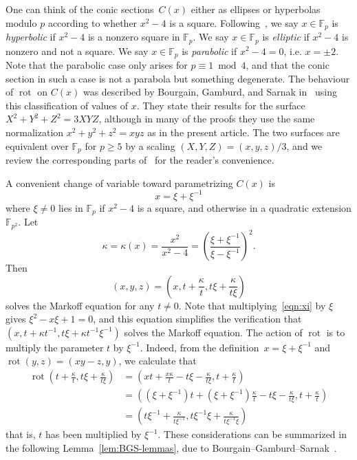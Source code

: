 \documentclass[10pt]{amsart}
\theoremstyle{definition}\newtheorem{defi}[theo]{Definition}\newtheorem{rema}[theo]{Remark}\newtheorem{exam}[theo]{Example}\newtheorem{exem}[theo]{Example}\newtheorem{nota}[theo]{Notation}
\newcommand{\F}{\mathbb{F}}
\DeclareMathOperator{\rot}{rot}
\begin{document}
One can think of the conic sections~$C(x)$ either as ellipses or hyperbolas modulo $p$ according to whether $x^2-4$ is a square. Following~\cite{BGS}, we say $x\in\F_{p}$ is \emph{hyperbolic} if $x^{2}-4$ is a nonzero square in $\F_{p}$. We say $x\in\F_{p}$ is \emph{elliptic} if $x^{2}-4$ is nonzero and not a square. We say $x\in\F_{p}$ is \emph{parabolic} if $x^{2}-4=0$, i.e. $x=\pm2$. Note that the parabolic case only arises for $p \equiv 1 \bmod 4$, and that the conic section in such a case is not a parabola but something degenerate. The behaviour of $\rot$ on $C(x)$ was described by Bourgain, Gamburd, and Sarnak in~\cite{BGS} using this classification of values of $x$. They state their results for the surface $X^2 + Y^2 + Z^2 = 3XYZ$, although in many of the proofs they use the same normalization $x^2 + y^2 + z^2 = xyz$ as in the present article. The two surfaces are equivalent over $\F_p$ for $p \geq 5$ by a scaling $(X,Y,Z) = (x,y,z)/3$, and we review the corresponding parts of~\cite{BGS} for the reader's convenience.

A convenient change of variable toward parametrizing $C(x)$ is
\begin{equation}\label{eqn:xi}
x = \xi + \xi^{-1}
\end{equation}
where $\xi \neq 0$ lies in $\F_p$ if $x^2-4$ is a square, and otherwise in a quadratic extension $\F_{p^2}$. Let
\begin{equation}\label{eqn:kappa}
\kappa = \kappa(x) = \frac{x^2}{x^2 - 4} = \left(\frac{ \xi + \xi^{-1} }{\xi - \xi^{-1}} \right)^2.
\end{equation}
Then
\[
(x,y,z) = \left(x, t + \frac{\kappa}{t}, t\xi + \frac{\kappa}{t\xi} \right)
\]
solves the Markoff equation for any $t \neq 0$. Note that multiplying~\eqref{eqn:xi} by $\xi$ gives $\xi^2 - x\xi + 1 = 0$, and this equation simplifies the verification that $(x,t+\kappa t^{-1}, t\xi + \kappa t^{-1}\xi^{-1})$ solves the Markoff equation. The action of $\rot$ is to multiply the parameter $t$ by $\xi^{-1}$. Indeed, from the definition~$x = \xi + \xi^{-1}$ and $\rot(y,z) = (xy-z,y)$, we calculate that
\begin{align*}
\rot \left(t + \frac{\kappa}{t}, t\xi + \frac{\kappa}{t\xi} \right) &= \left(xt + \frac{x\kappa}{t} - t\xi - \frac{\kappa}{t\xi}, t + \frac{\kappa }{t} \right) \\
&= \left((\xi+\xi^{-1})t + (\xi+\xi^{-1})\frac{\kappa}{t} - t\xi - \frac{\kappa}{t\xi}, t + \frac{\kappa}{t} \right) \\
&= \left(t\xi^{-1} + \frac{\kappa}{t\xi^{-1}}, t\xi^{-1} \xi + \frac{\kappa}{t\xi^{-1} \xi} \right)
\end{align*}
that is, $t$ has been multiplied by $\xi^{-1}$. These considerations can be summarized in the following Lemma~\ref{lem:BGS-lemmas}, due to Bourgain--Gamburd--Sarnak~\cite{BGS}.
\end{document}
